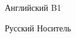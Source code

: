 
\begin{cvskills}

  \cvskill
    {Английский} %
    {B1} %

  \cvskill
    {Русский} %
    {Носитель} %
    
\end{cvskills}
